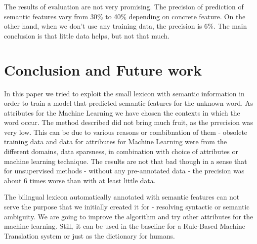 \documentclass[10pt,a5paper,twoside]{article}
\begin{document}
The results of evaluation are not very promising. The precision of prediction
of semantic features vary from 30\% to 40\% depending on concrete feature.
On the other hand, when we don't use any training data, the precision is 6\%.
The main conclusion is that little data helps, but not that much.


\section{Conclusion and Future work}
In this paper we tried to exploit the small lexicon with semantic information
in order to train a model that predicted semantic features for the unknown word.
As attributes for the Machine Learning we have chosen the contexts in which the word occur.
The method described did not bring much fruit, as the prrecision was very low. This can
be due to various reasons or combibnation of them - obsolete training data and data
for attributes for Machine Learning were from the different domains, data sparsness, 
in combination with choice of attributes or machine learning technique. 
The results are not that bad though in a sense that for
unsupervised methods - without any pre-annotated data - the precision was about 6 times
worse than with at least little data. 

The bilingual lexicon automatically annotated with semantic features can not serve
the purpose that we initially created it for - resolving syntactic or semantic ambiguity.
We are going to improve the algorithm and try other attributes for the machine learning.
Still, it can be used in the baseline for a Rule-Based Machine Translation system or
just as the dictionary for humans.
 





\end{document}
